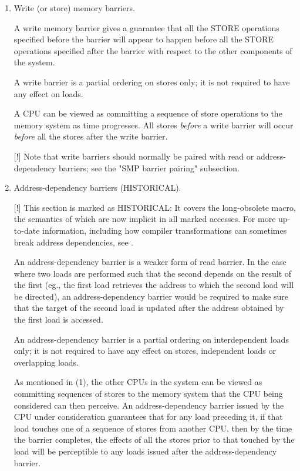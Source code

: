 \begin{enumerate}
 \item
     Write (or store) memory barriers.

     A write memory barrier gives a guarantee that all the STORE operations
     specified before the barrier will appear to happen before all the STORE
     operations specified after the barrier with respect to the other
     components of the system.

     A write barrier is a partial ordering on stores only; it is not required
     to have any effect on loads.

     A CPU can be viewed as committing a sequence of store operations to the
     memory system as time progresses.
     All stores \emph{before} a write barrier will occur \emph{before} all
     the stores after the write barrier.

     [!] Note that write barriers should normally be paired with read or
     address-dependency barriers; see the "SMP barrier pairing" subsection.


 \item
     Address-dependency barriers (HISTORICAL).

     [!] This section is marked as HISTORICAL\@:
     It covers the long-obsolete  macro,
     the semantics of which are now implicit in all marked accesses.
     For more up-to-date information, including how compiler transformations
     can sometimes break address dependencies, see
     .

     An address-dependency barrier is a weaker form of read barrier.
     In the case where two loads are performed such that the second depends
     on the result of the first (eg., the first load retrieves the address
     to which the second load will be directed), an address-dependency
     barrier would be required to make sure that the target of the second
     load is updated after the address obtained by the first load is
     accessed.

     An address-dependency barrier is a partial ordering on interdependent
     loads only; it is not required to have any effect on stores, independent
     loads or overlapping loads.

     As mentioned in (1), the other CPUs in the system can be viewed as
     committing sequences of stores to the memory system that the CPU being
     considered can then perceive.
     An address-dependency barrier issued by the CPU under consideration
     guarantees that for any load preceding it, if that load touches one of
     a sequence of stores from another CPU, then by the time the barrier
     completes, the effects of all the stores prior to that touched by the
     load will be perceptible to any loads issued after the
     address-dependency barrier.


\end{enumerate}
